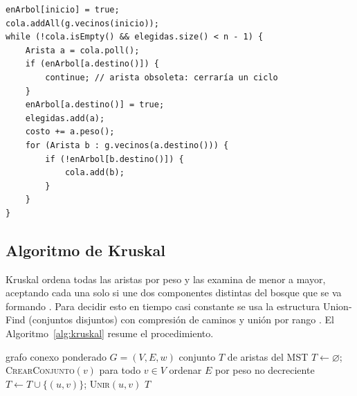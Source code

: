 \documentclass[conference]{IEEEtran}
\begin{document}
\noindent\begin{minipage}{\columnwidth}
\begin{lstlisting}[caption={Núcleo de Prim (\texttt{Prim.java}).},label={lst:prim}]
enArbol[inicio] = true;
cola.addAll(g.vecinos(inicio));
while (!cola.isEmpty() && elegidas.size() < n - 1) {
    Arista a = cola.poll();
    if (enArbol[a.destino()]) {
        continue; // arista obsoleta: cerraría un ciclo
    }
    enArbol[a.destino()] = true;
    elegidas.add(a);
    costo += a.peso();
    for (Arista b : g.vecinos(a.destino())) {
        if (!enArbol[b.destino()]) {
            cola.add(b);
        }
    }
}
\end{lstlisting}
\end{minipage}\par\medskip

\subsection{Algoritmo de Kruskal}
Kruskal ordena todas las aristas por peso y las examina de menor a mayor, aceptando cada una solo si une dos componentes distintas del bosque que se va formando \cite{kruskal}. Para decidir esto en tiempo casi constante se usa la estructura Union-Find (conjuntos disjuntos) con compresión de caminos y unión por rango \cite{tarjan75}. El Algoritmo~\ref{alg:kruskal} resume el procedimiento.

\begin{algorithm}[t]
\caption{Kruskal$(G)$}
\label{alg:kruskal}
\begin{algorithmic}[1]
\Require grafo conexo ponderado $G=(V,E,w)$
\Ensure conjunto $T$ de aristas del MST
\State $T\gets\varnothing$; \textsc{CrearConjunto}$(v)$ para todo $v\in V$
\State ordenar $E$ por peso no decreciente
    \State $T\gets T\cup\{(u,v)\}$; \textsc{Unir}$(u,v)$
  \EndIf
\EndFor
\State \Return $T$
\end{algorithmic}
\end{algorithm}
\end{document}
